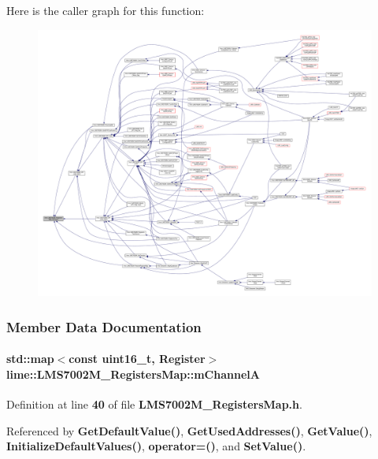 Here is the caller graph for this function\+:
\nopagebreak
\begin{figure}[H]
\begin{center}
\leavevmode
\includegraphics[width=350pt]{da/de5/classlime_1_1LMS7002M__RegistersMap_a97f5d0ffbaa6c0e67f2ccccb9475a540_icgraph}
\end{center}
\end{figure}




\subsubsection{Member Data Documentation}
\paragraph[{m\+ChannelA}]{\setlength{\rightskip}{0pt plus 5cm}std\+::map$<$const uint16\+\_\+t, {\bf Register}$>$ lime\+::\+L\+M\+S7002\+M\+\_\+\+Registers\+Map\+::m\+ChannelA\hspace{0.3cm}{\ttfamily [protected]}}\label{classlime_1_1LMS7002M__RegistersMap_a3f967155198b48374f0a035765c258ea}


Definition at line {\bf 40} of file {\bf L\+M\+S7002\+M\+\_\+\+Registers\+Map.\+h}.



Referenced by {\bf Get\+Default\+Value()}, {\bf Get\+Used\+Addresses()}, {\bf Get\+Value()}, {\bf Initialize\+Default\+Values()}, {\bf operator=()}, and {\bf Set\+Value()}.


